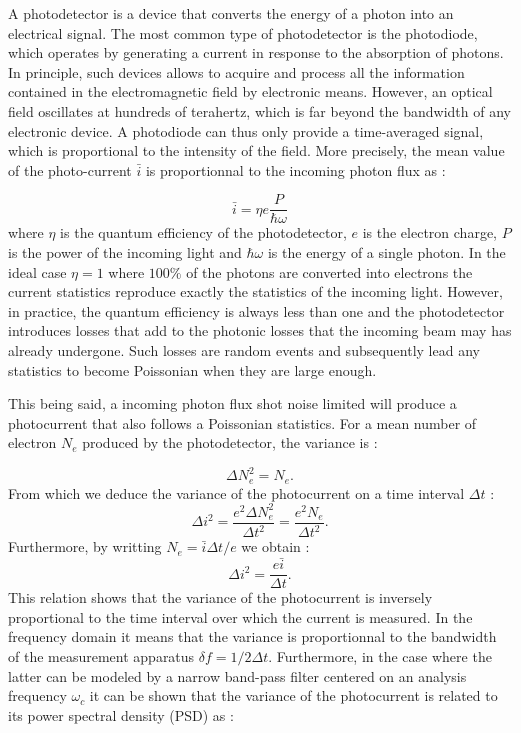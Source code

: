 A photodetector is a device that converts the energy of a photon into an electrical signal. The most common type of photodetector is the photodiode, which operates by generating a current in response to the absorption of photons. 
In principle, such devices allows to acquire and process all the information contained in the electromagnetic field by electronic means.
However, an optical field oscillates at hundreds of terahertz, which is far beyond the bandwidth of any electronic device. A photodiode can thus 
only provide a time-averaged signal, which is proportional to the intensity of the field. More precisely, the mean value of the photo-current $\bar{i}$ is proportionnal to the incoming photon flux as :

\begin{equation}
    \label{eq:photocurrent}
    \bar{i} = \eta e \dfrac{P}{\hbar\omega}
\end{equation}
where $\eta$ is the quantum efficiency of the photodetector, $e$ is the electron charge, $P$ is the power of the incoming light and $\hbar\omega$ is the energy of a single photon. 
In the ideal case $\eta=1$ where $100\%$ of the photons are converted into electrons the current statistics reproduce exactly the statistics of the incoming light.
However, in practice, the quantum efficiency is always less than one and the photodetector introduces losses that add to the photonic losses that the incoming beam may has already undergone.
Such losses are random events and subsequently lead any statistics to become Poissonian when they are large enough.


This being said, a incoming photon flux shot noise limited will produce a photocurrent that also follows a Poissonian statistics. For a mean number 
of electron $N_e$ produced by the photodetector, the variance is :

\begin{equation}
    \label{eq:n_e_variance}
    \Delta N_e^2 = N_e.
\end{equation}
From which we deduce the variance of the photocurrent on a time interval $\Delta t$ :
\begin{equation}
    \label{eq:photocurrent_variance}
    \Delta i^2 = \dfrac{e^2\Delta N_e^2}{\Delta t^2}=\dfrac{e^2N_e}{\Delta t^2}.
\end{equation}
Furthermore, by writting $N_e=\bar{i}\Delta t/e$ we obtain :
\begin{equation}
    \label{eq:photocurrent_variance2}
    \Delta i^2 = \dfrac{e\bar{i}}{\Delta t}.
\end{equation}
This relation shows that the variance of the photocurrent is inversely proportional to the time interval over which the current is measured. In the frequency
domain it means that the variance is proportionnal to the bandwidth of the measurement apparatus $\delta f=1/2\Delta t$. 
Furthermore, in the case where the latter can be modeled by a narrow band-pass filter centered on an analysis frequency $\omega_c$ it can be shown \cite{fabre_houches_97}
that the variance of the photocurrent is related to its power spectral density (PSD) as :


